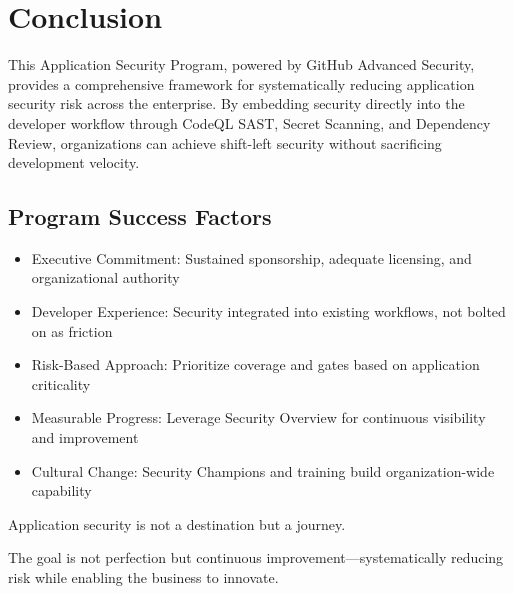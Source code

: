 \documentclass[11pt]{article}
\begin{document}
\section{Conclusion}

This Application Security Program, powered by GitHub Advanced Security, provides a comprehensive framework for systematically reducing application security risk across the enterprise. By embedding security directly into the developer workflow through CodeQL SAST, Secret Scanning, and Dependency Review, organizations can achieve shift-left security without sacrificing development velocity.

\subsection{Program Success Factors}

\begin{itemize}[leftmargin=*]
\item Executive Commitment: Sustained sponsorship, adequate licensing, and organizational authority
\item Developer Experience: Security integrated into existing workflows, not bolted on as friction
\item Risk-Based Approach: Prioritize coverage and gates based on application criticality
\item Measurable Progress: Leverage Security Overview for continuous visibility and improvement
\item Cultural Change: Security Champions and training build organization-wide capability
\end{itemize}
Application security is not a destination but a journey.

The goal is not perfection but continuous improvement---systematically reducing risk while enabling the business to innovate.
\end{document}
